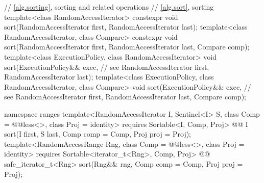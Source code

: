\begin{codeblock}
  // \ref{alg.sorting}, sorting and related operations
  // \ref{alg.sort}, sorting
  template<class RandomAccessIterator>
    constexpr void sort(RandomAccessIterator first, RandomAccessIterator last);
  template<class RandomAccessIterator, class Compare>
    constexpr void sort(RandomAccessIterator first, RandomAccessIterator last,
              Compare comp);
  template<class ExecutionPolicy, class RandomAccessIterator>
    void sort(ExecutionPolicy&& exec, // see 
              RandomAccessIterator first, RandomAccessIterator last);
  template<class ExecutionPolicy, class RandomAccessIterator, class Compare>
    void sort(ExecutionPolicy&& exec, // see 
              RandomAccessIterator first, RandomAccessIterator last,
              Compare comp);
\end{codeblock}\begin{addedblock}\begin{codeblock}
  namespace ranges {
    template<RandomAccessIterator I, Sentinel<I> S, class Comp = @@less<>,
        class Proj = identity>
      requires Sortable<I, Comp, Proj>
      @@ I
        sort(I first, S last, Comp comp = Comp{}, Proj proj = Proj{});
    template<RandomAccessRange Rng, class Comp = @@less<>, class Proj = identity>
      requires Sortable<iterator_t<Rng>, Comp, Proj>
      @@ safe_iterator_t<Rng>
        sort(Rng&& rng, Comp comp = Comp{}, Proj proj = Proj{});
  }
\end{codeblock}\end{addedblock}\begin{codeblock}


\end{codeblock}
